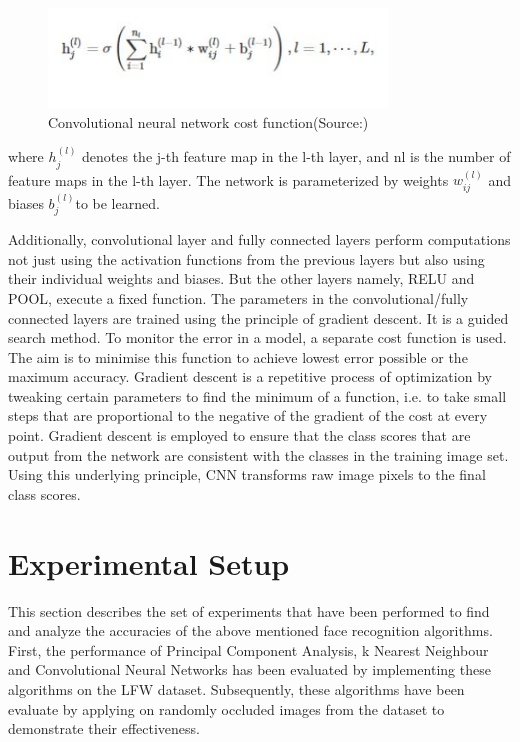 \documentclass[conference]{IEEEtran}
\begin{document}
\begin{figure}[h!]
 \centering
 \includegraphics[width = 9cm]{cnn_formula.JPG}
 \caption{ Convolutional neural network cost function(Source:\cite{lee2009convolutional})}
 \label{fig 1: Convolutional Neural Network cost function}
\end{figure}

where $h^{(l)}_j$ denotes the j-th feature map in the l-th layer, and nl is the number of feature maps in the l-th layer. The network is parameterized by weights $w_{ij}^{(l)}$ and biases $b_j^{(l)}$to be learned\cite{lee2009convolutional}.

Additionally, convolutional layer and fully connected layers perform computations not just using the activation functions from the previous layers but also using their individual weights and biases. But the other layers namely, RELU and POOL, execute a  fixed function. The parameters in the convolutional/fully connected layers are trained using the principle of gradient descent. It is a guided search method. To monitor the error in a model, a separate cost function is used. The aim is to minimise this function to achieve lowest error possible or the maximum accuracy. Gradient descent is a repetitive process of optimization by tweaking certain parameters to find the minimum of a function, i.e. to take small steps that are proportional to the negative of the gradient of the cost at every point. Gradient descent is employed to ensure that the class scores that are output from the network are consistent with the classes in the training image set. Using this underlying principle, CNN transforms raw image pixels to the final class scores. 

\section{Experimental Setup}
\label{sec:4 Experimental Setup} 


This section describes the set of experiments that have been performed to find and analyze the accuracies of the above mentioned face recognition algorithms. First, the performance of Principal Component Analysis, k Nearest Neighbour and Convolutional Neural Networks has been evaluated by implementing these algorithms on the LFW dataset. Subsequently, these algorithms have been evaluate by applying on randomly occluded images from the dataset to demonstrate their effectiveness.
\end{document}
